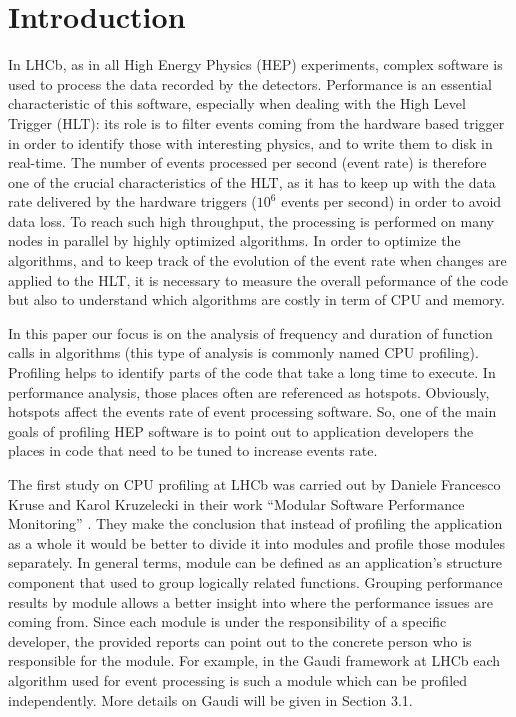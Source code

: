 \documentclass[a4paper]{jpconf}
\begin{document}
\section{Introduction}
In LHCb, as in all High Energy Physics (HEP) experiments, complex software is used to process the data recorded 
by the detectors. Performance is an essential characteristic of this software, especially when dealing with 
the High Level Trigger (HLT): its role is to filter events coming from the hardware based trigger in order to identify 
those with interesting physics, and to write them to disk in real-time. The number of events processed per 
second (event rate) is therefore one of the crucial characteristics of the HLT, as it has to keep up with the data rate 
delivered by the hardware triggers ($10^6$ events per second) in order to avoid data loss. To reach such high 
throughput, the processing is performed on many nodes in parallel by highly optimized algorithms. In order to optimize 
the algorithms, and to keep track of the evolution of the event rate when changes are applied to the HLT, it is 
necessary to measure the overall peformance of the code but also to understand which algorithms are costly in term of 
CPU and memory.

In this paper our focus is on the analysis of frequency and duration of function calls in algorithms (this type of 
analysis is commonly named CPU profiling). Profiling helps to identify parts of the code that take a long time to 
execute. In performance analysis, those places often are referenced as hotspots. Obviously,  hotspots affect the events 
rate of event processing software. So, one of the main goals of profiling HEP software is to point out to application 
developers the places in code that need to be tuned to increase events rate.

The first study on CPU profiling at LHCb was carried out by Daniele Francesco Kruse and Karol Kruzelecki in their work 
“Modular Software Performance Monitoring” \cite{modular}. They make the conclusion that instead of profiling 
the application as a whole it would be better to divide it into modules and profile those modules separately. 
In general terms,  module can be defined as an application’s structure component that used to group logically 
related functions.  Grouping performance results by module allows a better insight into where the performance 
issues are coming from. Since each module is under the responsibility of a specific developer,  the provided reports 
can point out to the concrete person who is responsible for the module. For example, in the Gaudi \cite{gaudi} 
framework at LHCb each algorithm used for event processing is such a module which can be profiled independently. 
More details on Gaudi will be given in Section 3.1. 
\end{document}
